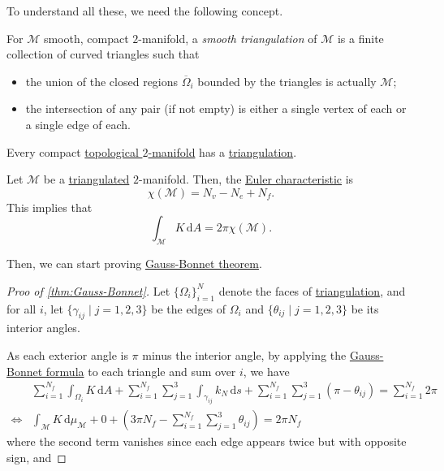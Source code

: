 To understand all these, we need the following concept.

\begin{definition}\label{def:smooth-triangulation}
	For \(\mathcal{M} \) smooth, compact \(2\)-manifold, a \emph{smooth triangulation} of \(\mathcal{M} \) is a finite collection of curved triangles such that
	\begin{itemize}
		\item the union of the closed regions \(\overline{\Omega} _i\) bounded by the triangles is actually \(\mathcal{M} \);
		\item the intersection of any pair (if not empty) is either a single vertex of each or a single edge of each.
	\end{itemize}
\end{definition}

\begin{theorem}
	Every compact \hyperref[def:topological-manifold]{topological \(2\)-manifold} has a \hyperref[def:smooth-triangulation]{triangulation}.
\end{theorem}

Let \(\mathcal{M} \) be a \hyperref[def:smooth-triangulation]{triangulated} \(2\)-manifold. Then, the \hyperref[def:Euler-characteristic]{Euler characteristic} is
\[
	\chi (\mathcal{M} ) = N_v - N_e + N_f.
\]
This implies that
\[
	\int _\mathcal{M} K \,\mathrm{d} A = 2 \pi \chi (\mathcal{M} ).
\]

Then, we can start proving \hyperref[thm:Gauss-Bonnet]{Gauss-Bonnet theorem}.

\begin{proof}[Proo of \autoref{thm:Gauss-Bonnet}]
	Let \(\{ \Omega _i \}_{i=1}^N \) denote the faces of \hyperref[def:smooth-triangulation]{triangulation}, and for all \(i\), let \(\{ \gamma _{ij} \mid j = 1, 2, 3 \} \) be the edges of \(\Omega _i\) and \(\{ \theta _{ij} \mid j = 1, 2, 3 \} \) be its interior angles.

	As each exterior angle is \(\pi \) minus the interior angle, by applying the \hyperref[note:Gauss-Bonnet-formula]{Gauss-Bonnet formula} to each triangle and sum over \(i\), we have
	\[
		\begin{split}
			&\sum_{i=1}^{N_f} \int _{\Omega _i} K \,\mathrm{d} A
			+ \sum_{i=1}^{N_f} \sum_{j=1}^{3} \int _{\gamma _{ij}} k_N \,\mathrm{d} s
			+ \sum_{i=1}^{N_f} \sum_{j=1}^{3} (\pi - \theta _{ij})
			= \sum_{i=1}^{N_f} 2\pi\\
			\iff & \int _{\mathcal{M}} K \,\mathrm{d} \mu _{\mathcal{M} }
			+ 0
			+ \left( 3\pi N_f - \sum_{i=1}^{N_f} \sum_{j=1}^{3} \theta _{ij} \right)
			= 2\pi N_f
		\end{split}
	\]
	where the second term vanishes since each edge appears twice but with opposite sign, and
\end{proof}


